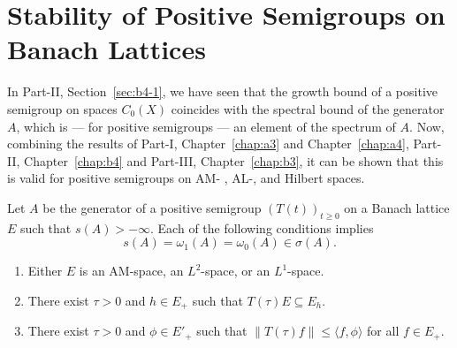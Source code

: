 \section{Stability of Positive Semigroups on Banach Lattices}\label{sec:c4-1} 
\hspace{1cm}{\Large by Günther Greiner and Frank Neubrander}
\vspace{.5cm}
\newline
In Part-II, Section~\ref{sec:b4-1}, we have seen that the growth bound of a positive semigroup on spaces $C_{0}(X)$ coincides with the spectral bound of the generator $A$, which is --- for positive semigroups --- an element of the spectrum of\/ $A$.
Now, combining the results of Part-I, Chapter~\ref{chap:a3} and Chapter~\ref{chap:a4},  
Part-II, Chapter~\ref{chap:b4} and Part-III, Chapter~\ref{chap:b3},  it can be shown that this is valid for positive semigroups on AM- , AL-, and Hilbert spaces.
\begin{theorem}\label{thm:c4-1.1}
Let $A$ be the generator of a positive semigroup $(T(t))_{t \geq 0}$ on a Banach lattice $E$ such that $s(A) > -\infty$.
Each of the following conditions implies
\begin{equation*}\label{eq:c4-1.0-kgk}
s(A) = \omega_{1}(A) = \omega_{0}(A) \in \sigma(A) .
\end{equation*}
\begin{enumerate}[\upshape (i)] 
    \item \label{thm:c4-1.1-1}
    Either $E$ is an AM-space,  an $L^{2}$-space, or an $L^{1}$-space.
    
    \item \label{thm:c4-1.1-2}
    There exist $\tau > 0$ and $h \in E_{+}$ such that $T(\tau)E \subseteq E_{h}$.
    
    \item \label{thm:c4-1.1-3}
    There exist $\tau > 0$ and $\phi \in E'_{+}$ such that $\|T(\tau)f\| \leq \langle f,\phi\rangle$ for all $f \in E_{+}$.
\end{enumerate}
\end{theorem}
